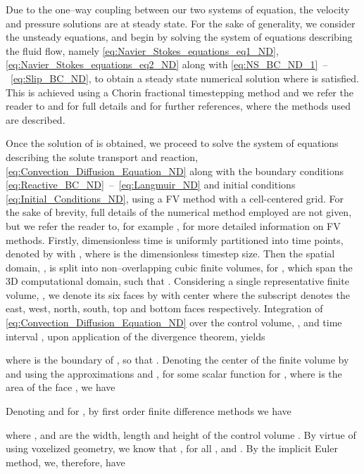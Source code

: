 \documentclass[preprint, 1p, authoryear]{elsarticle}
\begin{document}
Due to the one--way coupling between our two systems of equation,  the velocity and pressure solutions are  at steady state. For the sake of  generality, we consider the unsteady equations, and begin by solving the system of equations describing the fluid flow, namely \eqref{eq:Navier_Stokes_equations_eq1_ND}, \eqref{eq:Navier_Stokes_equations_eq2_ND} along with \eqref{eq:NS_BC_ND_1}~--~\eqref{eq:Slip_BC_ND},  to obtain a steady state numerical solution where   is satisfied. This is achieved using a Chorin fractional timestepping method and we refer the reader to \citet{Ciegis2007On} and \citet{Lakdawala2010phd} for full details and for further references, where the methods used are  described. 

Once the solution of  is obtained, we proceed to solve the system of equations describing the solute transport and reaction, \eqref{eq:Convection_Diffusion_Equation_ND} along with the boundary conditions \eqref{eq:Reactive_BC_ND}~--~\eqref{eq:Langmuir_ND} and initial conditions \eqref{eq:Initial_Conditions_ND}, using a FV method with a cell-centered grid. For the sake of brevity, full details of the numerical method employed are not given, but we refer the reader to, for example \citet{causonintroductory}, for more detailed information on  FV methods.  
Firstly, dimensionless time is uniformly partitioned into  time points, denoted by  with , where  is the dimensionless timestep size. 
Then the spatial  domain, , is  split into  non--overlapping cubic finite volumes,  for , which span the 3D computational domain, such that . Considering a single representative finite volume, , we denote its six faces by  with center  where the subscript  denotes the east, west, north, south, top and bottom faces respectively. Integration of \eqref{eq:Convection_Diffusion_Equation_ND} over the control volume, , and time interval , upon application of the divergence theorem, yields

where  is the boundary of , so that  . 
Denoting the center of the finite volume by  and using the approximations  and , for some scalar function  for , where  is the area of the face , we have

Denoting  and  for 
, by first order finite difference methods we have

where ,   and  are the width, length and height of the control volume . 
By virtue of using voxelized geometry, we know that ,  for all , and . By the implicit Euler method, we, therefore, have
\end{document}
